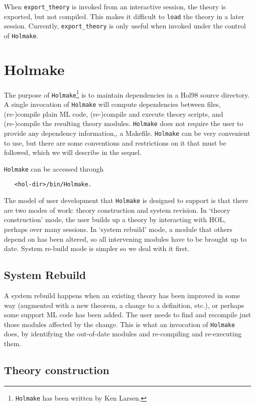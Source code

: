 When \verb+export_theory+ is invoked from an interactive session, the
theory is exported, but not compiled. This makes it difficult to
\verb+load+ the theory in a later session. Currently,
\verb+export_theory+ is only useful when invoked under the control of
\verb+Holmake+.

\section{Holmake}

  The purpose of \verb+Holmake+\footnote{{\tt Holmake} has been written by
Ken Larsen.} is to maintain dependencies in a Hol98 source directory. A
single invocation of {\tt Holmake} will compute dependencies between files,
(re-)compile plain ML code, (re-)compile and execute theory scripts, and
(re-)compile the resulting theory modules. {\tt Holmake} does not require the
user to provide any dependency information,\eg, a Makefile. {\tt Holmake}
can be very convenient to use, but there are some conventions and
restrictions on it that must be followed, which we will describe in the
sequel.

{\tt Holmake} can be accessed through
\begin{verbatim}
   <hol-dir>/bin/Holmake.
\end{verbatim}


  The model of user development that {\tt Holmake} is designed to support is
that there are two modes of work: theory construction and system
revision.  In `theory construction' mode, the user builds up a theory by
interacting with HOL, perhaps over many sessions. In `system rebuild'
mode, a module that others depend on has been altered, so all
intervening modules have to be brought up to date. System re-build mode
is simpler so we deal with it first.


\subsection{System Rebuild}

A system rebuild happens when an existing theory has been improved in
some way (augmented with a new theorem, a change to a definition, etc.),
or perhaps some support ML code has been added. The user needs to find
and recompile just those modules affected by the change. This is what an
invocation of {\tt Holmake} does, by identifying the out-of-date modules and
re-compiling and re-executing them.


\subsection{Theory construction}

